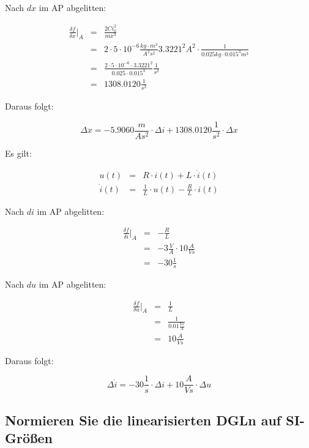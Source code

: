 \documentclass[a4paper,10pt,left=1.5cm,right=1.5cm,top=1.5cm,bottom=1.5cm]{article}
\begin{document}
Nach $dx$ im AP abgelitten:

\begin{eqnarray*}
 \frac{\delta f}{\delta x} \bigg\vert_A &=& \frac{2 C i_0^2}{m x^3} \\
&=& 2 \cdot 5 \cdot 10^{-6} \frac{kg \cdot m^3}{A^2 s^2} 3.3221^2 A^2 \cdot \frac{1}{0.025 kg \cdot 0.015^3 m^3} \\
&=& \frac{2 \cdot 5 \cdot 10^{-6} \cdot 3.3221^2}{0.025 \cdot 0.015^3} \frac{1}{s^2} \\
&=& 1308.0120 \frac{1}{s^2}
\end{eqnarray*}

Daraus folgt:

\begin{equation}
  \Delta \ddot{x} = - 5.9060 \frac{m}{A s^2} \cdot \Delta i + 1308.0120 \frac{1}{s^2} \cdot \Delta x
\end{equation}

Es gilt:

\begin{eqnarray*}
  u(t) &=& R \cdot i(t) + L \cdot \dot{i}(t) \\
  \dot{i}(t) &=& \frac{1}{L} \cdot u(t) - \frac{R}{L} \cdot i(t)
\end{eqnarray*}

Nach $di$ im AP abgelitten:

\begin{eqnarray*}
  \frac{\delta f}{\delta i} \bigg\vert_A &=& - \frac{R}{L} \\
&=& - 3 \frac{V}{A} \cdot 10 \frac{A}{Vs} \\
&=& - 30 \frac{1}{s}
\end{eqnarray*}

Nach $du$ im AP abgelitten:

\begin{eqnarray*}
  \frac{\delta f}{\delta u} \bigg\vert_A &=& \frac{1}{L} \\
&=& \frac{1}{0.01 \frac{Vs}{A}} \\
&=& 10 \frac{A}{Vs}
\end{eqnarray*}

Daraus folgt:

\begin{equation}
  \Delta \dot{i} = -30 \frac{1}{s} \cdot \Delta i + 10 \frac{A}{Vs} \cdot \Delta u
\end{equation}

\subsection{Normieren Sie die linearisierten DGLn auf SI-Größen}
\end{document}

